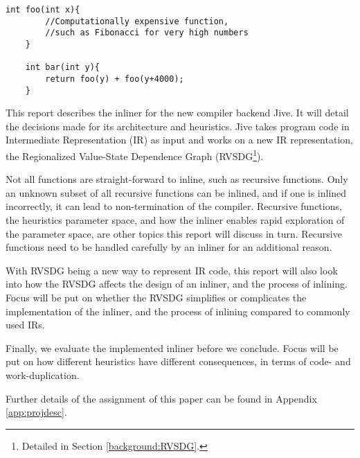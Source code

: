 \begin{lstlisting}[label={lst:work-dup}, style=customcpp,
caption={Work duplication in \textit{bar()}, when inlining \textit{foo()} into
\textit{bar()}.}]
	int foo(int x){
		//Computationally expensive function,
		//such as Fibonacci for very high numbers
	}

	int bar(int y){
		return foo(y) + foo(y+4000);
	}
\end{lstlisting}


This report describes the inliner for the new compiler backend Jive. It will
detail the decisions made for its architecture and heuristics. Jive takes
program code in Intermediate Representation (IR) as input and works on a new IR
representation, the Regionalized Value-State Dependence Graph
(RVSDG\footnote{Detailed in Section \ref{background:RVSDG}.}).

Not all functions are straight-forward to inline, such as recursive functions.
Only an unknown subset of all recursive functions can be inlined, and if one is
inlined incorrectly, it can lead to non-termination of the compiler. Recursive
functions, the heuristics parameter space, and how the inliner enables rapid
exploration of the parameter space, are other topics this report will discuss in
turn. Recursive functions need to be handled carefully by an inliner for an
additional reason.

With RVSDG being a new way to represent IR code, this report will also look into
how the RVSDG affects the design of an inliner, and the process of inlining.
Focus will be put on whether the RVSDG simplifies or complicates the
implementation of the inliner, and the process of inlining compared to commonly
used IRs.

Finally, we evaluate the implemented inliner before we conclude. Focus will be
put on how different heuristics have different consequences, in terms of code-
and work-duplication.

Further details of the assignment of this paper can be found in Appendix
\ref{app:projdesc}.
